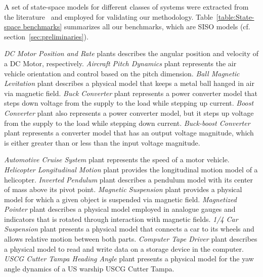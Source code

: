 \documentclass[runningheads,a4paper]{llncs}
\begin{document}
A set of state-space models for different classes of 
systems were extracted from the 
literature~\cite{Franklin15,maglev,converters,CTMS} 
and employed for validating our methodology. 
%
%
Table~\ref{table:State-space benchmarks} summarizes 
all our benchmarks, which are SISO models (cf. section~\ref{sec:preliminaries}). 

\textit{DC Motor Position and Rate} plants describes the angular position and 
velocity of a DC Motor, respectively. 
\textit{Aircraft Pitch Dynamics} plant represents the air vehicle orientation and 
control based on the pitch dimension. 
\textit{Ball Magnetic Levitation} plant describes a physical model that keeps a 
metal ball hanged in air via magnetic field. 
\textit{Buck Converter} plant represents a power converter model that steps down 
voltage from the supply to the load while stepping up current. 
\textit{Boost Converter} plant also represents a power converter model, but
it steps up voltage from the supply to the load while stepping down current. 
\textit{Buck-boost Converter} plant represents a converter model that has an output 
voltage magnitude, which is either greater than or less than the input voltage magnitude. 

\textit{Automotive Cruise System} plant represents the speed of a motor vehicle. 
\textit{Helicopter Longitudinal Motion} plant provides the longitudinal motion model 
of a helicopter. 
\textit{Inverted Pendulum} plant describes a pendulum model
with its center of mass above its pivot point. 
\textit{Magnetic Suspension} plant provides a physical model for which 
a given object is suspended via magnetic field. 
\textit{Magnetized Pointer} plant describes a physical model employed in analogue gauges 
and indicators that is rotated through interaction with magnetic fields.
\textit{1/4 Car Suspension} plant presents a physical model that connects a car to its wheels 
and allows relative motion between both parts.
\textit{Computer Tape Driver} plant describes a physical model to read and write data 
on a storage device in the computer.
\textit{USCG Cutter Tampa Heading Angle} plant presents a physical model 
for the yaw angle dynamics of a US warship USCG Cutter Tampa.
\end{document}
